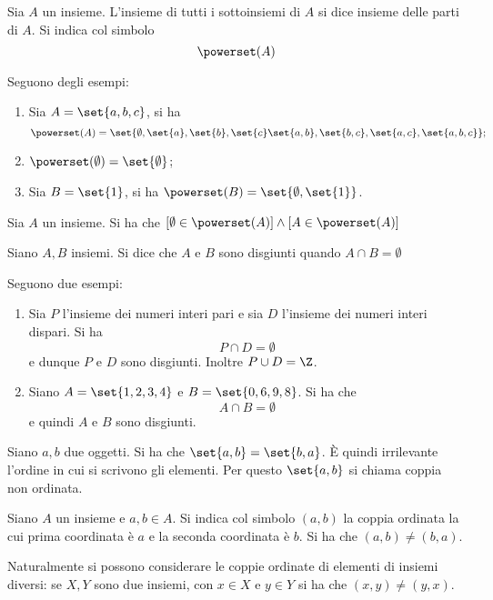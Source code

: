 \begin{definition}\label{def:insieme_parti}
    Sia \(A\) un insieme. L'insieme di tutti i sottoinsiemi di \(A\) si dice insieme delle parti di \(A\). Si indica col simbolo
    \[
        \powerset(A)
    \]
\end{definition}

\begin{examples}
    Seguono degli esempi:
    \begin{enumerate}
        \item Sia \(A = \set{a, b, c}\), si ha
        \[
            \powerset(A) = \set{\emptyset, \set{a}, \set{b}, \set{c} \set{a, b}, \set{b, c}, \set{a, c}, \set{a, b, c}};
        \]
        \item \(\powerset(\emptyset) = \set{\emptyset}\);
        \item Sia \(B = \set{1}\), si ha \(\powerset(B) = \set{\emptyset, \set{1}}\).
    \end{enumerate}
\end{examples}


\begin{remark}
    Sia \(A\) un insieme. Si ha che \([\emptyset \in \powerset(A)] \land [A \in \powerset(A)]\)
\end{remark}


\begin{definition}\label{def:insiemi:disgiunti}
    Siano \(A, B\) insiemi. Si dice che \(A\) e \(B\) sono disgiunti quando \(A \cap B = \emptyset\)
\end{definition}


\begin{examples}
    Seguono due esempi:
    \begin{enumerate}
        \item Sia \(P\) l'insieme dei numeri interi pari e sia \(D\) l'insieme dei numeri interi dispari. Si ha
            \[
                P \cap D = \emptyset
            \]
            e dunque \(P\) e \(D\) sono disgiunti. Inoltre \(P \cup D = \Z\).
        \item Siano \(A = \set{1, 2, 3, 4}\) e \(B = \set{0, 6, 9, 8}\). Si ha che
            \[
                A \cap B = \emptyset
            \]
            e quindi \(A\) e \(B\) sono disgiunti.
    \end{enumerate}
\end{examples}

\begin{remark}
    Siano \(a, b\) due oggetti. Si ha che \(\set{a, b} = \set{b, a}\). È quindi irrilevante l'ordine in cui si scrivono gli elementi. Per questo \(\set{a, b}\) si chiama coppia non ordinata.

    Siano \(A\) un insieme e \(a, b \in A\). Si indica col simbolo \((a, b)\) la coppia ordinata la cui prima coordinata è \(a\) e la seconda coordinata è \(b\). Si ha che \((a, b) \neq (b, a)\).
\end{remark}
Naturalmente si possono considerare le coppie ordinate di elementi di insiemi diversi: se \(X, Y\) sono due insiemi, con \(x \in X\) e \(y \in Y\) si ha che \((x, y) \neq (y, x)\).


